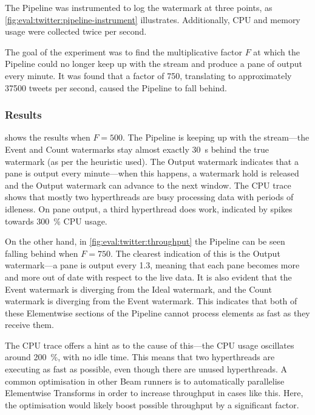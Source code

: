 The Pipeline was instrumented to log the watermark at three points, as \cref{fig:eval:twitter:pipeline-instrument} illustrates.
Additionally, CPU and memory usage were collected twice per second.

The goal of the experiment was to find the multiplicative factor $F$ at which the Pipeline could no longer keep up with the stream and produce a pane of output every minute.
It was found that a factor of \num{750}, translating to approximately \num{37500} tweets per second, caused the Pipeline to fall behind.

\subsubsection{Results}

 shows the results when $F = 500$.
The Pipeline is keeping up with the stream---the Event and Count watermarks stay almost exactly \SI{30}{\second} behind the true watermark (as per the heuristic used).
The Output watermark indicates that a pane is output every minute---when this happens, a watermark hold is released and the Output watermark can advance to the next window.
The CPU trace shows that mostly two hyperthreads are busy processing data with periods of idleness.
On pane output, a third hyperthread does work, indicated by spikes towards \SI{300}{\percent} CPU usage.

On the other hand, in \cref{fig:eval:twitter:throughput} the Pipeline can be seen falling behind when $F = 750$.
The clearest indication of this is the Output watermark---a pane is output every \SI{1.3}{\min}, meaning that each pane becomes more and more out of date with respect to the live data.
It is also evident that the Event watermark is diverging from the Ideal watermark, and the Count watermark is diverging from the Event watermark.
This indicates that both of these Elementwise sections of the Pipeline cannot process elements as fast as they receive them.

The CPU trace offers a hint as to the cause of this---the CPU usage oscillates around \SI{200}{\percent}, with no idle time.
This means that two hyperthreads are executing as fast as possible, even though there are unused hyperthreads.
A common optimisation in other Beam runners is to automatically parallelise Elementwise Transforms in order to increase throughput in cases like this.
Here, the optimisation would likely boost possible throughput by a significant factor.

